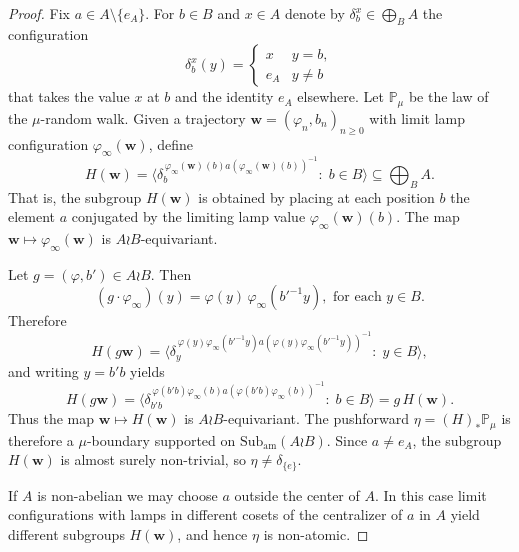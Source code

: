 \documentclass[reqno,a4paper,11pt]{amsart}
\numberwithin{equation}{section}
\newcommand{\1}{\mathbf{1}}
\theoremstyle{definition}
\begin{document}
	\begin{proof}
		Fix $a\in A\setminus\{e_A\}$. For $b\in B$ and $x\in A$ denote by
		$\delta_b^x\in\bigoplus_B A$ the configuration
		\[
		\delta_b^x(y)=
		\begin{cases}
			x & y=b,\\
			e_A & y\neq b 
		\end{cases}
		\]
		that takes the value $x$ at $b$ and the identity $e_A$ elsewhere. Let $\mathbb P_\mu$ be the law of the $\mu$-random walk.
		Given a trajectory
		$\mathbf w=(\varphi_n,b_n)_{n\ge0}$ with limit lamp configuration
		$\varphi_\infty(\mathbf w)$, define
		\[
		H(\mathbf w)
		=
		\Big\langle
		\delta_b^{\,\varphi_\infty(\mathbf w)(b)a(\varphi_\infty(\mathbf w)(b))^{-1}}
		:\; b\in B
		\Big\rangle
		\subseteq \bigoplus_B A .
		\]
		That is, the subgroup $H(\mathbf{w})$ is obtained by placing at each position $b$
		the element $a$ conjugated by the limiting lamp value $\varphi_{\infty}(\mathbf{w})(b)$. The map $\mathbf w\mapsto\varphi_\infty(\mathbf w)$ is
		$A\wr B$-equivariant. 
		
		Let $g=(\varphi,b')\in A\wr B$. Then
		\[
		(g\cdot \varphi_\infty)(y)
		=
		\varphi(y)\,\varphi_\infty(b'^{-1}y), \text{ for each }y\in B.
		\]
		Therefore
		\[
		H(g\mathbf w)
		=
		\Big\langle
		\delta_y^{\,\varphi(y)\varphi_\infty(b'^{-1}y)a(\varphi(y)\varphi_\infty(b'^{-1}y))^{-1}}
		:\; y\in B
		\Big\rangle,
		\]
		and writing $y=b'b$ yields
		\[
		H(g\mathbf w)
		=
		\Big\langle
		\delta_{b'b}^{\,\varphi(b'b)\varphi_\infty(b)a(\varphi(b'b)\varphi_\infty(b))^{-1}}
		:\; b\in B
		\Big\rangle
		=
		g\,H(\mathbf w).
		\]
		Thus the map $\mathbf w\mapsto H(\mathbf w)$ is $A\wr B$-equivariant.
		The pushforward \( \eta = (H)_*\mathbb P_\mu\) is therefore a $\mu$-boundary supported on
		$\mathrm{Sub}_{\mathrm{am}}(A\wr B)$. Since $a\neq e_A$, the subgroup
		$H(\mathbf w)$ is almost surely non-trivial, so
		$\eta\neq \delta_{\{e\}}$.
		
		If $A$ is non-abelian we may choose $a$ outside the center of $A$. In this case limit configurations with lamps in different cosets of the centralizer of $a$ in $A$ yield different subgroups $H(\mathbf w)$, and hence $\eta$ is non-atomic.
	\end{proof}

	
	
\end{document}
